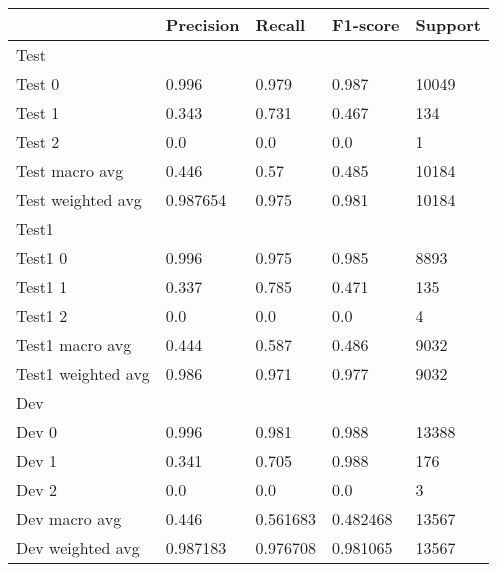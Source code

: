 \begin{tabular}{lllll}
\toprule
{} & Precision &    Recall &  F1-score & Support \\
\midrule
Test               &           &           &           &         \\
Test 0             &     0.996 &     0.979 &     0.987 &   10049 \\
Test 1             &     0.343 &     0.731 &     0.467 &     134 \\
Test 2             &       0.0 &       0.0 &       0.0 &       1 \\
Test macro avg     &     0.446 &      0.57 &     0.485 &   10184 \\
Test weighted avg  &  0.987654 &     0.975 &     0.981 &   10184 \\
Test1              &           &           &           &         \\
Test1 0            &     0.996 &     0.975 &     0.985 &    8893 \\
Test1 1            &     0.337 &     0.785 &     0.471 &     135 \\
Test1 2            &       0.0 &       0.0 &       0.0 &       4 \\
Test1 macro avg    &     0.444 &     0.587 &     0.486 &    9032 \\
Test1 weighted avg &     0.986 &     0.971 &     0.977 &    9032 \\
Dev                &           &           &           &         \\
Dev 0              &     0.996 &     0.981 &     0.988 &   13388 \\
Dev 1              &     0.341 &     0.705 &     0.988 &     176 \\
Dev 2              &       0.0 &       0.0 &       0.0 &       3 \\
Dev macro avg      &     0.446 &  0.561683 &  0.482468 &   13567 \\
Dev weighted avg   &  0.987183 &  0.976708 &  0.981065 &   13567 \\
\bottomrule
\end{tabular}
